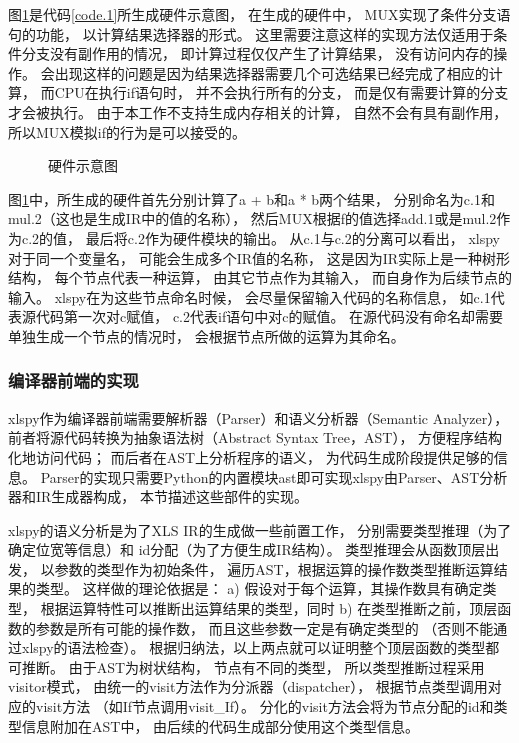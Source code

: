 图\ref{fig.1}是代码\ref{code.1}所生成硬件示意图，
在生成的硬件中，
MUX实现了条件分支语句的功能，
以计算结果选择器的形式。
这里需要注意这样的实现方法仅适用于条件分支没有副作用的情况，
即计算过程仅仅产生了计算结果，
没有访问内存的操作。
会出现这样的问题是因为结果选择器需要几个可选结果已经完成了相应的计算，
而CPU在执行if语句时，
并不会执行所有的分支，
而是仅有需要计算的分支才会被执行。
由于本工作不支持生成内存相关的计算，
自然不会有具有副作用，
所以MUX模拟if的行为是可以接受的。

\begin{figure}[h]
\centering

\caption{硬件示意图}
\label{fig.1}
\end{figure}

图\ref{fig.1}中，所生成的硬件首先分别计算了a + b和a * b两个结果，
分别命名为c.1和mul.2（这也是生成IR中的值的名称），
然后MUX根据f的值选择add.1或是mul.2作为c.2的值，
最后将c.2作为硬件模块的输出。
从c.1与c.2的分离可以看出，
xlspy对于同一个变量名，
可能会生成多个IR值的名称，
这是因为IR实际上是一种树形结构，
每个节点代表一种运算，
由其它节点作为其输入，
而自身作为后续节点的输入。
xlspy在为这些节点命名时候，
会尽量保留输入代码的名称信息，
如c.1代表源代码第一次对c赋值，
c.2代表if语句中对c的赋值。
在源代码没有命名却需要单独生成一个节点的情况时，
会根据节点所做的运算为其命名。

\subsubsection{编译器前端的实现}

xlspy作为编译器前端需要解析器（Parser）和语义分析器（Semantic Analyzer），
前者将源代码转换为抽象语法树（Abstract Syntax Tree，AST），
方便程序结构化地访问代码；
而后者在AST上分析程序的语义，
为代码生成阶段提供足够的信息。
Parser的实现只需要Python的内置模块ast即可实现xlspy由Parser、AST分析器和IR生成器构成，
本节描述这些部件的实现。

xlspy的语义分析是为了XLS IR的生成做一些前置工作，
分别需要类型推理（为了确定位宽等信息）和
id分配（为了方便生成IR结构）。
类型推理会从函数顶层出发，
以参数的类型作为初始条件，
遍历AST，根据运算的操作数类型推断运算结果的类型。
这样做的理论依据是：
a) 假设对于每个运算，其操作数具有确定类型，
根据运算特性可以推断出运算结果的类型，同时
b) 在类型推断之前，顶层函数的参数是所有可能的操作数，
而且这些参数一定是有确定类型的
（否则不能通过xlspy的语法检查）。
根据归纳法，以上两点就可以证明整个顶层函数的类型都可推断。
由于AST为树状结构，
节点有不同的类型，
所以类型推断过程采用visitor模式，
由统一的visit方法作为分派器（dispatcher），
根据节点类型调用对应的visit方法
（如If节点调用visit\_If）。
分化的visit方法会将为节点分配的id和类型信息附加在AST中，
由后续的代码生成部分使用这个类型信息。

